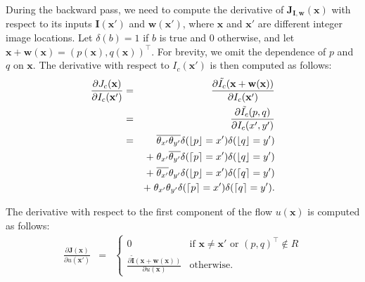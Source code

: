 \documentclass[10pt,twocolumn,letterpaper]{article}%
\newcommand{\Aceil}[1]{\lceil #1 \rceil}%
\newcommand{\Afloor}[1]{\lfloor #1 \rfloor}%
\begin{document}
During the backward pass, we need to compute the derivative of $\mathbf{J}_{\mathbf{I},\mathbf{w}}(\mathbf{x})$ with respect to its inputs $\mathbf{I}(\mathbf{x}')$ and  $\mathbf{w}(\mathbf{x}')$, where $\mathbf{x}$ and $\mathbf{x}'$ are different integer image locations.
Let $\delta(b) = 1$ if $b$ is true and 0 otherwise, and let $\mathbf{x}+\mathbf{w}(\mathbf{x}) = (p(\mathbf{x}), q(\mathbf{x}))^\top$. For brevity, we omit the dependence of $p$ and $q$ on $\mathbf{x}$. The derivative with respect to $I_c(\mathbf{x}')$ is then computed as follows: 
\begin{eqnarray} 
\frac{\partial J_c(\mathbf{x})}{\partial I_c(\mathbf{x}')} 
& = & \frac{\partial \tilde{I_c}(\mathbf{x}+\mathbf{w}(\mathbf{x}))}{\partial I_c(\mathbf{x}')} \nonumber  \\
& = & \frac{\partial \tilde{I_c}(p,q)}{\partial I_c(x',y')}  \nonumber \\
 & = &  \phantom{+\;} \conj{\theta_{x'}}\conj{\theta_{y'}}\delta(\Afloor{p} = x')\delta(\Afloor{q} = y') \nonumber \\
    && +\; \theta_{x'}\conj{\theta_{y'}} \delta(\Aceil{p} = x')\delta(\Afloor{q} = y') \nonumber  \\
    && +\; \conj{\theta_{x'}}\theta_{y'} \delta(\Afloor{p} = x')\delta(\Aceil{q} = y') \nonumber  \\
    && +\; \theta_{x'}\theta_{y'} \delta(\Aceil{p} = x')\delta(\Aceil{q} = y') \mbox{.}
\end{eqnarray} 

The derivative with respect to the first component of the flow $u(\mathbf{x})$ is computed as follows: 
\begin{eqnarray} 
\frac{\partial \mathbf{J}(\mathbf{x})}{\partial u(\mathbf{x'})} & = &  
\begin{cases}
0 & \mbox{if } \mathbf{x} \ne \mathbf{x'} \mbox{ or } (p, q)^\top \notin R \\
\frac{\partial \tilde{\mathbf{I}}(\mathbf{x}+\mathbf{w}(\mathbf{x}))}{\partial u(\mathbf{x})} & \mbox{otherwise.} 
\end{cases} 
\end{eqnarray} 
\end{document}
